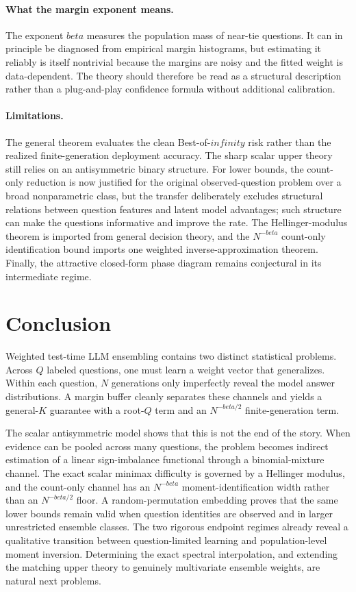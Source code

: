 \documentclass[11pt]{article}
\def\beta{beta}%
\def\infty{infinity}%
\newcommand\ced[1]{{\color{teal!70!black} #1}}
\begin{document}
\paragraph{What the margin exponent means.}
The exponent $\beta$ measures the population mass of near-tie questions.  It can in principle be diagnosed from empirical margin histograms, but estimating it reliably is itself nontrivial because the margins are noisy and the fitted weight is data-dependent.  The theory should therefore be read as a structural description rather than a plug-and-play confidence formula without additional calibration.

\paragraph{Limitations.}
The general theorem evaluates the clean Best-of-$\infty$ risk rather than the realized finite-generation deployment accuracy.  The sharp scalar upper theory still relies on an antisymmetric binary structure.  For lower bounds, the count-only reduction is now justified for the original observed-question problem over a broad nonparametric class, but the transfer deliberately excludes structural relations between question features and latent model advantages; such structure can make the questions informative and improve the rate.  The Hellinger-modulus theorem is imported from general decision theory, and the $N^{-\beta}$ count-only identification bound imports one weighted inverse-approximation theorem.  Finally, the attractive closed-form phase diagram remains conjectural in its intermediate regime.

\section{Conclusion}

Weighted test-time LLM ensembling contains two distinct statistical problems.  Across $Q$ labeled questions, one must learn a weight vector that generalizes.  Within each question, $N$ generations only imperfectly reveal the model answer distributions.  A margin buffer cleanly separates these channels and yields a general-$K$ guarantee with a root-$Q$ term and an $N^{-\beta/2}$ finite-generation term.

The scalar antisymmetric model shows that this is not the end of the story.  When evidence can be pooled across many questions, the problem becomes indirect estimation of \ced{a linear sign-imbalance functional} through a binomial-mixture channel.  The exact scalar minimax difficulty is governed by a Hellinger modulus, and the count-only channel has an $N^{-\beta}$ moment-identification width rather than an $N^{-\beta/2}$ floor.  A random-permutation embedding proves that the same lower bounds remain valid when question identities are observed and in larger unrestricted ensemble classes.  The two rigorous endpoint regimes already reveal a qualitative transition between question-limited learning and population-level moment inversion.  Determining the exact spectral interpolation, and extending the matching upper theory to genuinely multivariate ensemble weights, are natural next problems.
\end{document}
